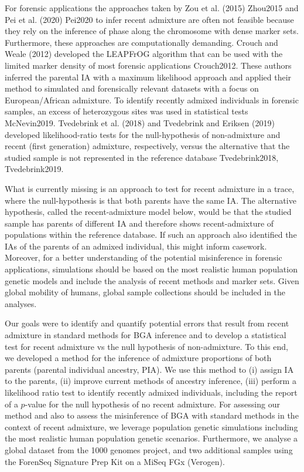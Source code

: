 \documentclass[12pt]{article}
\theoremstyle{definition}
\begin{document}
For forensic applications the approaches taken by Zou et al. (2015) \cite{article}{Zhou2015} and Pei et al. (2020) \cite{article}{Pei2020} to infer recent admixture are often not feasible because they rely on the inference of phase along the chromosome with dense marker sets. Furthermore, these approaches are computationally demanding. Crouch and Weale (2012) developed the LEAPFrOG algorithm that can be used with the limited marker density of most forensic applications \cite{article}{Crouch2012}. These authors inferred the parental IA with a maximum likelihood approach and applied their method to simulated and forensically relevant datasets with a focus on European/African admixture. To identify recently admixed individuals in forensic samples, an excess of heterozygous sites was used in statistical tests \cite{article}{McNevin2019}. Tvedebrink et al. (2018) and Tvedebrink and Eriksen (2019) developed likelihood-ratio tests for the null-hypothesis of non-admixture and recent (first generation) admixture, respectively, versus the alternative that the studied sample is not represented in the reference database \cite{article}{Tvedebrink2018, Tvedebrink2019}.

What is currently missing is an approach to test for recent admixture in a trace, where the null-hypothesis is that both parents have the same IA. The alternative hypothesis, called the recent-admixture model below, would be that the studied sample has parents of different IA and therefore shows recent-admixture of populations within the reference database. If such an approach also identified the IAs of the parents of an admixed individual, this might inform casework. Moreover, for a better understanding of the potential misinference in forensic applications, simulations should be based on the most realistic human population genetic models and include the analysis of recent methods and marker sets. Given global mobility of humans, global sample collections should be included in the analyses.

Our goals were to identify and quantify potential errors that result from recent admixture in standard methods for BGA inference and to develop a statistical test for recent admixture vs the null hypothesis of non-admixture. To this end, we developed a method for the inference of admixture proportions of both parents (parental individual ancestry, PIA). We use this method to (i) assign IA to the parents, (ii) improve current methods of ancestry inference, (iii) perform a likelihood ratio test to identify recently admixed individuals{\color{blue}, including the report of a $p$-value for the null hypothesis of no recent admixture}. For assessing our method and also to assess the misinference of BGA with standard methods in the context of recent admixture, we leverage population genetic simulations including the most realistic human population genetic scenarios. Furthermore, we {\color{blue} analyse} a global dataset from the 1000 genomes project, and two {\color{blue} additional }samples using the ForenSeq Signature Prep Kit on a MiSeq FGx (Verogen). 
\end{document}

